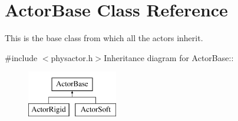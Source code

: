 \hypertarget{classActorBase}{
\section{ActorBase Class Reference}
\label{dd/d7b/classActorBase}
}


This is the base class from which all the actors inherit.  


{\ttfamily \#include $<$physactor.h$>$}Inheritance diagram for ActorBase::\begin{figure}[H]
\begin{center}
\leavevmode
\includegraphics[height=2cm]{dd/d7b/classActorBase}
\end{center}
\end{figure}
